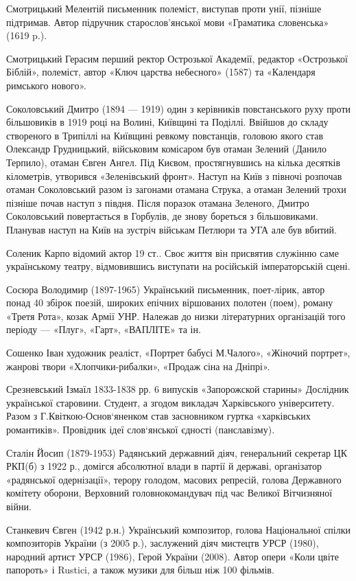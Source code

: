 Смотрицький  Мелентій письменник полеміст, виступав проти унії, пізніше підтримав. Автор підручник старослов'янської мови «Граматика словенська» (1619 p.).

Смотрицький Герасим  перший ректор Острозької Академії, редактор «Острозької Біблій», полеміст, автор «Ключ царства небесного» (1587) та «Календаря римського нового».

Соколовський Дмитро  (1894 --- 1919) один з керівників повстанського руху проти більшовиків в 1919 році на Волині, Київщині та Поділлі. Ввійшов до складу створеного в Трипіллі на Київщині ревкому повстанців, головою якого став Олександр Грудницький, військовим комісаром був отаман Зелений (Данило Терпило), отаман Євген Ангел.  Під Києвом, простягнувшись на кілька десятків кілометрів, утворився «Зеленівський фронт». Наступ на Київ з півночі розпочав отаман Соколовський разом із загонами отамана Струка, а отаман Зелений трохи пізніше почав наступ з півдня. Після поразок отамана Зеленого, Дмитро Соколовський повертається в Горбулів, де знову бореться з більшовиками. Планував наступ на Київ на зустріч військам Петлюри та УГА  але був вбитий.

Соленик Карпо відомий актор 19 ст.. Своє життя він присвятив служінню саме українському театру, відмовившись виступати на російській імператорській сцені.  

Сосюра Володимир (1897-1965) Український письменник, поет-лірик, автор понад 40 збірок поезій, широких епічних віршованих полотен (поем), роману «Третя Рота», козак Армії УНР. Належав до низки літературних організацій того періоду --- «Плуг», «Гарт», «ВАПЛІТЕ» та ін.

Сошенко Іван художник реаліст, «Портрет бабусі М.Чалого», «Жіночий портрет», жанрові твори «Хлопчики-рибалки», «Продаж сіна на Дніпрі».

Срезневський Ізмаїл 1833-1838 рр. 6 випусків «Запорожской старины» Дослідник української старовини. Студент, а згодом викладач Харківського університету. Разом з Г.Квіткою-Основ‘яненком став засновником гуртка «харківських романтиків». Провідник ідеї слов‘янської єдності (панславізму).

Сталін Йосип (1879-1953) Радянський державний діяч, генеральний секретар ЦК РКП(б) з 1922 р., домігся абсолютної влади в партії й державі, організатор «радянської одернізації», терору голодом, масових репресій, голова Державного комітету оборони, Верховний головнокомандувач під час Великої Вітчизняної війни.

Станкевич Євген (1942 р.н.) Український композитор, голова Національної спілки композиторів України (з 2005 р.), заслужений діяч мистецтв УРСР (1980), народний артист УРСР (1986), Герой України (2008). Автор опери «Коли цвіте папороть» і Rustici, а також музики для більш ніж 100 фільмів.


